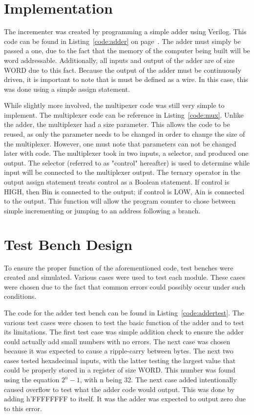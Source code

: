 \documentclass{article}
\newcommand{\Verilog}[3]{
  \lstset{language=Verilog}
  \lstset{backgroundcolor=\color{listinggray},rulecolor=\color{blue}}
  \lstset{linewidth=\textwidth}
  \lstset{commentstyle=\textit, stringstyle=\upshape,showspaces=false}
  \lstset{frame=tb}
  
}
\begin{document}
\section{Implementation}
The incrementer was created by programming a simple adder using Verilog. This code can be found in Listing~\ref{code:adder} on page~\pageref{code:adder}. The adder must simply be passed a one, due to the fact that the memory of the computer being built will be word addressable. Additionally, all inputs and output of the adder are of size WORD due to this fact. Because the output of the adder must be continuously driven, it is important to note that is must be defined as a wire. In this case, this was done using a simple assign statement. 

While slightly more involved, the multipexer code was still very simple to implement. The multiplexer code can be reference in Listing~\ref{code:mux}. Unlike the adder, the multiplexer had a size parameter. This allows the code to be reused, as only the parameter needs to be changed in order to change the size of the multiplexer. However, one must note that parameters can not be changed later with code. The multiplexer took in two inputs, a selector, and produced one output. The selector (referred to as "control" hereafter) is used to determine while input will be connected to the multiplexer output. The ternary operator in the output assign statement treats control as a Boolean statement. If control is HIGH, then Bin is connected to the output; if control is LOW, Ain is connected to the output. This function will allow the program counter to chose between simple incrementing or jumping to an address following a branch.

\Verilog{Verilog code for implementing an adder.}{code:adder}{H:/MIPS-Lab/code/0_common/adder.v}
\Verilog{Verilog code for implementing a mux.}{code:mux}{H:/MIPS-Lab/code/0_common/mux.v}

\section{Test Bench Design}
To ensure the proper function of the aforementioned code, test benches were created and simulated. Various cases were used to test each module. These cases were chosen due to the fact that common errors could possibly occur under such conditions. 

The code for the adder test bench can be found in Listing~\ref{code:addertest}. The various test cases were chosen to test the basic function of the adder and to test its limitations. The first test case was simple addition check to ensure the adder could actually add small numbers with no errors. The next case was chosen because it was expected to cause a ripple-carry between bytes. The next two cases tested hexadecimal inputs, with the latter testing the largest value that could be properly stored in a register of size WORD. This number was found using the equation $2^n -1$, with n being 32. The next case added intentionally caused overflow to test what the adder code would output. This was done by adding h'FFFFFFFF to itself. It was the adder was expected to output zero due to this error. 
\end{document}
